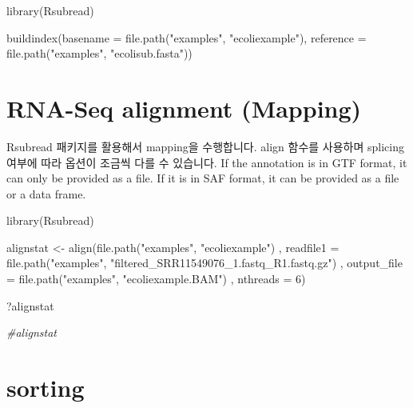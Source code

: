 \documentclass[
]{book}
\newenvironment{Shaded}{\begin{snugshade}}{\end{snugshade}}
\newcommand{\AttributeTok}[1]{\textcolor[rgb]{0.77,0.63,0.00}{#1}}
\newcommand{\CommentTok}[1]{\textcolor[rgb]{0.56,0.35,0.01}{\textit{#1}}}
\newcommand{\DecValTok}[1]{\textcolor[rgb]{0.00,0.00,0.81}{#1}}
\newcommand{\FunctionTok}[1]{\textcolor[rgb]{0.00,0.00,0.00}{#1}}
\newcommand{\NormalTok}[1]{#1}
\newcommand{\OtherTok}[1]{\textcolor[rgb]{0.56,0.35,0.01}{#1}}
\newcommand{\StringTok}[1]{\textcolor[rgb]{0.31,0.60,0.02}{#1}}
\begin{document}
\begin{Shaded}
\begin{Highlighting}[]
\FunctionTok{library}\NormalTok{(Rsubread)}

\FunctionTok{buildindex}\NormalTok{(}\AttributeTok{basename =} \FunctionTok{file.path}\NormalTok{(}\StringTok{"examples"}\NormalTok{, }\StringTok{"ecoliexample"}\NormalTok{), }
           \AttributeTok{reference =} \FunctionTok{file.path}\NormalTok{(}\StringTok{"examples"}\NormalTok{, }\StringTok{"ecolisub.fasta"}\NormalTok{))}
\end{Highlighting}
\end{Shaded}

\hypertarget{rna-seq-alignment-mapping}{%
\section{RNA-Seq alignment (Mapping)}\label{rna-seq-alignment-mapping}}

Rsubread 패키지를 활용해서 mapping을 수행합니다. align 함수를 사용하며 splicing 여부에 따라 옵션이 조금씩 다를 수 있습니다. If the annotation is in GTF format, it can only be provided as a file. If it is in SAF format, it can be provided as a file or a data frame.

\begin{Shaded}
\begin{Highlighting}[]
\FunctionTok{library}\NormalTok{(Rsubread)}

\NormalTok{alignstat }\OtherTok{\textless{}{-}} \FunctionTok{align}\NormalTok{(}\FunctionTok{file.path}\NormalTok{(}\StringTok{"examples"}\NormalTok{, }\StringTok{"ecoliexample"}\NormalTok{)}
\NormalTok{                   , }\AttributeTok{readfile1 =} \FunctionTok{file.path}\NormalTok{(}\StringTok{"examples"}\NormalTok{, }\StringTok{"filtered\_SRR11549076\_1.fastq\_R1.fastq.gz"}\NormalTok{)}
\NormalTok{                   , }\AttributeTok{output\_file =} \FunctionTok{file.path}\NormalTok{(}\StringTok{"examples"}\NormalTok{, }\StringTok{"ecoliexample.BAM"}\NormalTok{)}
\NormalTok{                   , }\AttributeTok{nthreads =} \DecValTok{6}\NormalTok{)}

\NormalTok{?alignstat}

\CommentTok{\#alignstat}
\end{Highlighting}
\end{Shaded}

\hypertarget{sorting}{%
\section{sorting}\label{sorting}}
\end{document}
